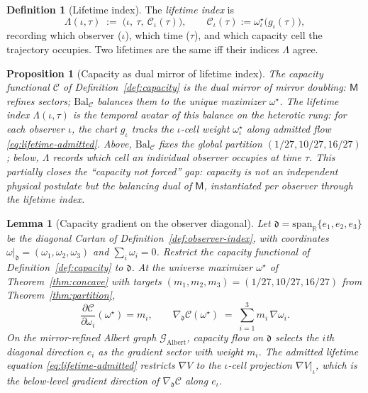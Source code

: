 \documentclass[11pt]{article}
\theoremstyle{plain}
\newtheorem{lemma}[theorem]{Lemma}
\newtheorem{proposition}[theorem]{Proposition}
\theoremstyle{definition}
\newtheorem{definition}[theorem]{Definition}
\theoremstyle{remark}
\numberwithin{equation}{section}
\newcommand{\R}{\mathbb{R}}
\newcommand{\Mirror}{\mathsf{M}}
\newcommand{\capacity}{\mathcal{C}}
\begin{document}
\begin{definition}[Lifetime index]\label{def:lifetime-index}
The \emph{lifetime index} is
\begin{equation}\label{eq:lifetime-index}
  \Lambda(\iota,\tau) \;:=\; \bigl(\iota,\ \tau,\ \capacity_\iota(\tau)\bigr),
  \qquad
  \capacity_\iota(\tau):=\omega^\star_\iota\bigl(g_\iota(\tau)\bigr),
\end{equation}
recording which observer ($\iota$), which time ($\tau$), and which capacity
cell the trajectory occupies. Two lifetimes are the same iff their indices
$\Lambda$ agree.
\end{definition}

\begin{proposition}[Capacity as dual mirror of lifetime index]
\label{prop:capacity-lifetime-dual}
The capacity functional $\capacity$ of Definition~\ref{def:capacity} is the
\emph{dual mirror} of mirror doubling: $\Mirror$ refines sectors;
$\mathrm{Bal}_{\mathcal{C}}$ balances them to the unique maximizer
$\omega^\star$. The lifetime index $\Lambda(\iota,\tau)$ is the
\emph{temporal} avatar of this balance on the heterotic rung: for each observer
$\iota$, the chart $g_\iota$ tracks the $\iota$-cell weight
$\omega^\star_\iota$ along admitted flow \eqref{eq:lifetime-admitted}. Above,
$\mathrm{Bal}_{\mathcal{C}}$ fixes the global partition $(1/27,10/27,16/27)$;
below, $\Lambda$ records which cell an individual observer occupies at time
$\tau$. This partially closes the ``capacity not forced'' gap: capacity is not
an independent physical postulate but the balancing dual of $\Mirror$,
instantiated per observer through the lifetime index.
\end{proposition}

\begin{lemma}[Capacity gradient on the observer diagonal]
\label{lem:capacity-gradient-d}
Let $\mathfrak{d}=\mathrm{span}_\R\{e_1,e_2,e_3\}$ be the diagonal Cartan of
Definition~\ref{def:observer-index}, with coordinates
$\omega|_{\mathfrak{d}}=(\omega_1,\omega_2,\omega_3)$ and
$\sum_i\omega_i=0$. Restrict the capacity functional of
Definition~\ref{def:capacity} to $\mathfrak{d}$. At the universe maximizer
$\omega^\star$ of Theorem~\ref{thm:concave} with targets
$(m_1,m_2,m_3)=(1/27,10/27,16/27)$ from Theorem~\ref{thm:partition},
\begin{equation}\label{eq:capacity-gradient-d}
  \frac{\partial\capacity}{\partial\omega_i}(\omega^\star)=m_i,
  \qquad
  \nabla_{\mathfrak{d}}\capacity(\omega^\star)
  \;=\;
  \sum_{i=1}^3 m_i\,\nabla\omega_i.
\end{equation}
On the mirror-refined Albert graph $\mathcal{G}_{\mathrm{Albert}}$, capacity
flow on $\mathfrak{d}$ selects the $i$th diagonal direction $e_i$ as the
gradient sector with weight $m_i$. The admitted lifetime equation
\eqref{eq:lifetime-admitted} restricts $\nabla V$ to the $\iota$-cell projection
$\nabla V|_{\iota}$, which is the below-level gradient direction of
$\nabla_{\mathfrak{d}}\capacity$ along $e_\iota$.
\end{lemma}
\end{document}
